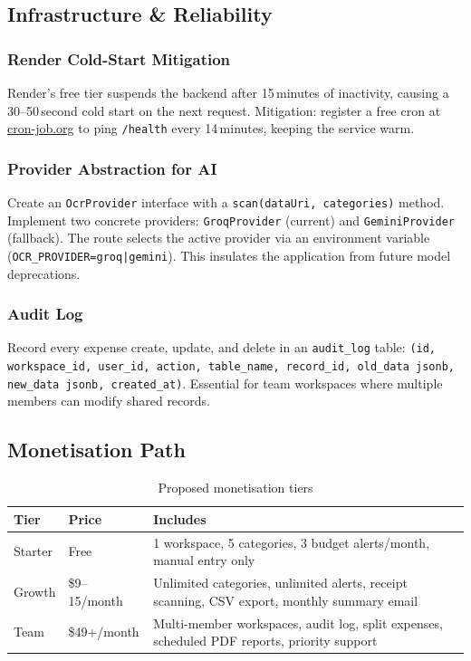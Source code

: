 \documentclass[11pt,a4paper]{article}
\begin{document}
\subsection{Infrastructure \& Reliability}

\subsubsection*{Render Cold-Start Mitigation}
Render's free tier suspends the backend after 15\,minutes of inactivity,
causing a 30--50\,second cold start on the next request. Mitigation: register
a free cron at \href{https://cron-job.org}{cron-job.org} to ping
\texttt{/health} every 14\,minutes, keeping the service warm.

\subsubsection*{Provider Abstraction for AI}
Create an \texttt{OcrProvider} interface with a \texttt{scan(dataUri, categories)}
method. Implement two concrete providers: \texttt{GroqProvider} (current) and
\texttt{GeminiProvider} (fallback). The route selects the active provider via an
environment variable (\texttt{OCR\_PROVIDER=groq|gemini}). This insulates the
application from future model deprecations.

\subsubsection*{Audit Log}
Record every expense create, update, and delete in an \texttt{audit\_log} table:
\texttt{(id, workspace\_id, user\_id, action, table\_name, record\_id, old\_data jsonb, new\_data jsonb, created\_at)}.
Essential for team workspaces where multiple members can modify shared records.

\subsection{Monetisation Path}

\begin{table}[h]
\centering
\renewcommand{\arraystretch}{1.35}
\begin{tabular}{p{2.5cm} p{2.5cm} p{7.5cm}}
\toprule
\textbf{Tier} & \textbf{Price} & \textbf{Includes} \\
\midrule
Starter  & Free          & 1 workspace, 5 categories, 3 budget alerts/month, manual entry only \\
Growth   & \$9--15/month & Unlimited categories, unlimited alerts, receipt scanning, CSV export, monthly summary email \\
Team     & \$49+/month   & Multi-member workspaces, audit log, split expenses, scheduled PDF reports, priority support \\
\bottomrule
\end{tabular}
\caption{Proposed monetisation tiers}
\end{table}
\end{document}
